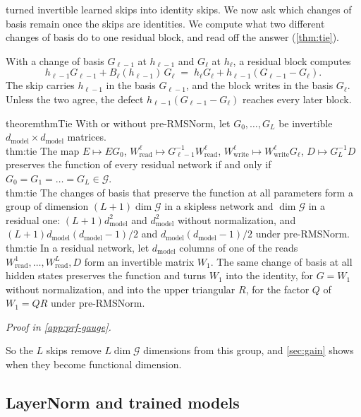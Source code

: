 \documentclass[10pt]{article}
\theoremstyle{definition}
\theoremstyle{remark}
\newcommand{\Wread}{W_{\mathrm{read}}}
\newcommand{\Wwrite}{W_{\mathrm{write}}}
\newcommand{\dm}{d_{\mathrm{model}}}
\newcommand{\G}{\mathcal{G}}
\newcommand{\ptlabel}[1]{\phantomsection\label{#1}}
\newcommand{\proofin}[1]{\par\vspace{-0.4\baselineskip}\noindent\hfill{\small\itshape Proof in \cref{#1}.}\par\smallskip}
\newcommand{\stpart}[3]{\ifx\relax#1\relax\else\ptlabel{#1:#2}\fi{\upshape\bfseries\boldmath(#2)\ifx\relax#3\relax\else\ #3.\fi}}
\begin{document}
 turned invertible learned skips into identity skips. We now ask which changes of basis remain once the skips are identities. We compute what two different changes of basis do to one residual block, and read off the answer (\cref{thm:tie}).

With a change of basis $G_{\ell-1}$ at $h_{\ell-1}$ and $G_\ell$ at $h_\ell$, a residual block computes
\begin{equation}\label{eq:defect}
h_{\ell-1}G_{\ell-1} + B_\ell(h_{\ell-1})\,G_\ell \;=\; h_\ell G_\ell + h_{\ell-1}(G_{\ell-1} - G_\ell).
\end{equation}
The skip carries $h_{\ell-1}$ in the basis $G_{\ell-1}$, and the block writes in the basis $G_\ell$. Unless the two agree, the defect $h_{\ell-1}(G_{\ell-1} - G_\ell)$ reaches every later block.

\begin{restatable}{theorem}{thmTie}\label{thm:tie}
With or without pre-RMSNorm, let $G_0, \dots, G_L$ be invertible $\dm\times\dm$ matrices.\\
\stpart{thm:tie}{i}{} The map $E \mapsto EG_0$, $\Wread^{\ell} \mapsto G_{\ell-1}^{-1}\Wread^{\ell}$, $\Wwrite^{\ell} \mapsto \Wwrite^{\ell}G_\ell$, $D \mapsto G_L^{-1}D$ preserves the function of every residual network if and only if $G_0 = G_1 = \dots = G_L \in \G$.\\
\stpart{thm:tie}{ii}{} The changes of basis that preserve the function at all parameters form a group of dimension $(L+1)\dim\G$ in a skipless network and $\dim\G$ in a residual one: $(L+1)\dm^2$ and $\dm^2$ without normalization, and $(L+1)\dm(\dm-1)/2$ and $\dm(\dm-1)/2$ under pre-RMSNorm.\\
\stpart{thm:tie}{iii}{} In a residual network, let $\dm$ columns of one of the reads $\Wread^{1}, \dots, \Wread^{L}, D$ form an invertible matrix $W_1$. The same change of basis at all hidden states preserves the function and turns $W_1$ into the identity, for $G = W_1$ without normalization, and into the upper triangular $R$, for the factor $Q$ of $W_1 = QR$ under pre-RMSNorm.
\end{restatable}
\proofin{app:prf-gauge}

So the $L$ skips remove $L\dim\G$ dimensions from this group, and \cref{sec:gain} shows when they become functional dimension.

\subsection{LayerNorm and trained models}\label{sec:norm}
\end{document}
